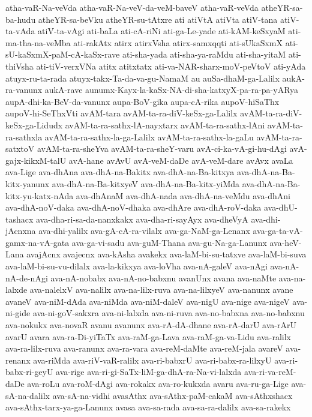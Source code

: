 {atha-vaR-Na-veVda
atha-vaR-Na-veV-da-veM-baveV
atha-vaR-veVda
atheYR-sa-ba-hudu
atheYR-sa-beVku
atheYR-su-tAtxre
ati
atiVtA
atiVta
atiV-tana
atiV-ta-vAda
atiV-ta-vAgi
ati-baLa
ati-cA-riNi
ati-ga-Le-yade
ati-kAM-keSxyaM
ati-ma-tha-na-veMba
ati-rakAtx
atirx
atirxVsha
atirx-samxqqti
ati-sUkaSxmX
ati-sU-kaSxmX-paM-cA-kaSx-rave
ati-sha-yada
ati-sha-ya-raMdu
ati-sha-yitaM
ati-thiVsha
ati-tiV-verxVNa
atitx
atitxtatx
ati-va-NAR-sharx-moV-peVtoV
ati-yAda
atuyx-ru-ta-rada
atuyx-takx-Ta-da-va-gu-NamaM
au
auSa-dhaM-ga-Lalilx
aukA-ra-vanunx
aukA-rave
aunumx-Kayx-la-kaSx-NA-di-sha-katxyX-pa-ra-pa-yARya
aupA-dhi-ka-BeV-da-vanunx
aupa-BoV-gika
aupa-cA-rika
aupoV-hiSaThx
aupoV-hi-SeThxVti
avAM-tara
avAM-ta-ra-diV-keSx-ga-Lalilx
avAM-ta-ra-diV-keSx-ga-Lidudx
avAM-ta-ra-sathx-lA-nayxtarx
avAM-ta-ra-sathx-lAni
avAM-ta-ra-sathxla
avAM-ta-ra-sathx-la-ga-Lalilx
avAM-ta-ra-sathx-la-gaLu
avAM-ta-ra-satxtoV
avAM-ta-ra-sheYva
avAM-ta-ra-sheY-varu
avA-ci-ka-vA-gi-hu-dAgi
avA-gajx-kikxM-talU
avA-hane
avAvU
avA-veM-daDe
avA-veM-dare
avAvx
avaLa
ava-Lige
ava-dhAna
ava-dhA-na-Bakitx
ava-dhA-na-Ba-kitxya
ava-dhA-na-Ba-kitx-yanunx
ava-dhA-na-Ba-kitxyeV
ava-dhA-na-Ba-kitx-yiMda
ava-dhA-na-Ba-kitx-yu-katx-nAda
ava-dhAnaM
ava-dhA-nada
ava-dhA-na-veMdu
ava-dhAni
ava-dhA-noV-daka
ava-dhA-noV-dhaka
ava-dhAre
ava-dhA-roV-daka
ava-dhU-tashacx
ava-dha-ri-sa-da-nanxkakx
ava-dha-ri-sayAyx
ava-dheVyA
ava-dhi-jAcnxna
ava-dhi-yalilx
ava-gA-cA-ra-vilalx
ava-ga-NaM-ga-Lenanx
ava-ga-ta-vA-gamx-na-vA-gata
ava-ga-vi-sadu
ava-guM-Thana
ava-gu-Na-ga-Lanunx
ava-heV-Lana
avajAcnx
avajecnx
ava-kAsha
avakekx
ava-laM-bi-su-tatxve
ava-laM-bi-suva
ava-laM-bi-su-vu-dilalx
ava-la-kikxya
ava-loVha
ava-nA-galeV
ava-nAgi
ava-nA-nA-de-nAgi
ava-nA-nobabx
ava-nA-no-babxnu
avanUnx
avana
ava-naMte
ava-na-lalxde
ava-nalelxV
ava-nalilx
ava-na-lilx-ruva
ava-na-lilxyeV
ava-nanunx
avane
avaneV
ava-niM-dAda
ava-niMda
ava-niM-daleV
ava-nigU
ava-nige
ava-nigeV
ava-ni-gide
ava-ni-goV-sakxra
ava-ni-lalxda
ava-ni-ruva
ava-no-babxna
ava-no-babxnu
ava-nokukx
ava-novaR
avanu
avanunx
ava-rA-dA-dhane
ava-rA-darU
ava-rArU
avarU
avara
ava-ra-Di-yiTaTx
ava-raM-ga-Lava
ava-raM-ga-va-Lidu
ava-ralilx
ava-ra-lilx-ruva
ava-ranunx
ava-ra-vara
ava-reM-daMte
ava-reM-jala
avareV
ava-renanx
ava-riMda
ava-riV-vaR-ralilx
ava-ri-babxrU
ava-ri-babx-ra-lilxyU
ava-ri-babx-ri-geyU
ava-rige
ava-ri-gi-SaTx-liM-ga-dhA-ra-Na-vi-lalxda
ava-ri-va-reM-daDe
ava-roLu
ava-roM-dAgi
ava-rokakx
ava-ro-kukxda
avaru
ava-ru-ga-Lige
ava-sA-na-dalilx
ava-sA-na-vidhi
avasAthx
ava-sAthx-paM-cakaM
ava-sAthxshacx
ava-sAthx-tarx-ya-ga-Lanunx
avasa
ava-sa-rada
ava-sa-ra-dalilx
ava-sa-rakekx
}
